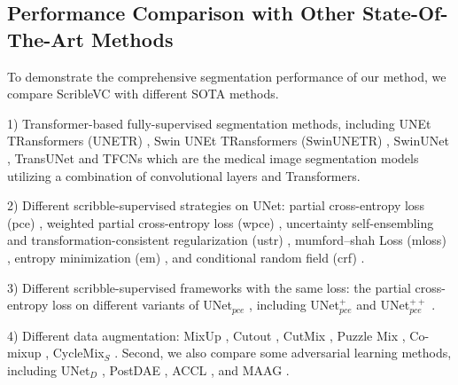 \documentclass[sigconf,natbib=false]{acmart}
\begin{document}
\subsection{Performance Comparison with Other State-Of-The-Art Methods}
To demonstrate the comprehensive segmentation performance of our method, we compare ScribleVC with different SOTA methods.

1) Transformer-based fully-supervised segmentation methods, including UNEt TRansformers (UNETR) \cite{Hatamizadeh_2022_WACV}, Swin UNEt TRansformers (SwinUNETR) \cite{swinunetr}, SwinUNet \cite{swinunet}, TransUNet \cite{chen2021transunet} and TFCNs \cite{li2022tfcns} which are the medical image segmentation models utilizing a combination of convolutional layers and Transformers.

2) Different scribble-supervised strategies on UNet: partial cross-entropy loss (pce) \cite{lin2016scribblesup}, 
weighted partial cross-entropy loss (wpce) \cite{MAAG}, uncertainty self-ensembling and transformation-consistent regularization (ustr) \cite{liu2022weakly}, mumford–shah Loss (mloss) \cite{kim2019mumford}, 
entropy minimization (em) \cite{EM}, and conditional random field (crf) \cite{crf}.

3) Different scribble-supervised frameworks with the same loss: the partial cross-entropy loss on different variants of UNet$_{pce}$ \cite{lin2016scribblesup}, including UNet$^{+}_{pce}$ \cite{unet+} 
and UNet$^{++}_{pce}$ \cite{unet++}.

4) Different data augmentation: MixUp \cite{mixup}, Cutout \cite{cutout}, CutMix \cite{cutmix}, Puzzle Mix \cite{puzzlemix}, Co-mixup \cite{comixup}, CycleMix$_S$ \cite{Zhang_2022_CycleMix}.
Second, we also compare some adversarial learning methods, including UNet$_D$ \cite{MAAG}, PostDAE \cite{postdae}, ACCL \cite{accl}, and MAAG \cite{MAAG}.
\end{document}
